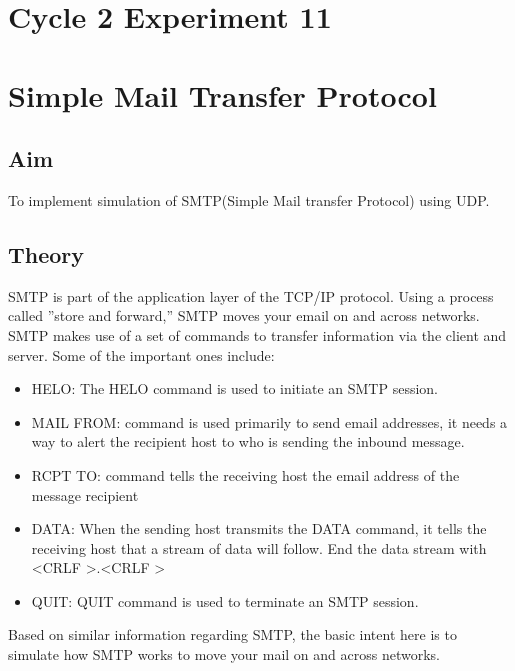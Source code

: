 \section*{Cycle 2 Experiment 11}

\section{\Large{Simple Mail Transfer Protocol}}

\subsection{Aim}
\large To implement simulation of SMTP(Simple Mail transfer Protocol) using UDP.

\subsection{Theory}
SMTP is part of the application layer of the TCP/IP protocol. Using a process called ”store and forward,” SMTP moves your email on and across networks. SMTP makes use of a set of commands to transfer information via the client and server. Some of the important ones include:
\begin{itemize}
    \item HELO: The HELO command is used to initiate an SMTP session.
    \item MAIL FROM: command is used primarily to send email addresses, it needs a way to alert the recipient host to who is sending the inbound message.
    \item RCPT TO: command tells the receiving host the email address of the message recipient
    \item DATA: When the sending host transmits the DATA command, it tells the receiving host that a stream of data will follow. End the data stream with <CRLF >.<CRLF >
    \item QUIT: QUIT command is used to terminate an SMTP session.
\end{itemize}
Based on similar information regarding SMTP, the basic intent here is to simulate how SMTP works to move your mail on and across networks.
